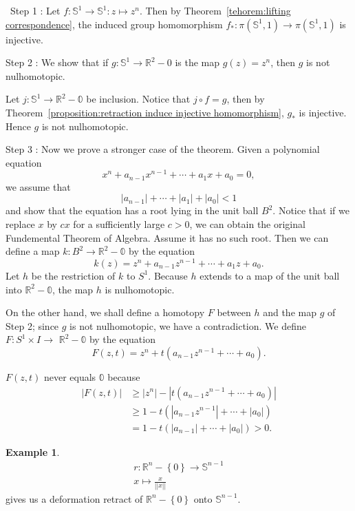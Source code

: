 \documentclass[12pt,a4paper]{book}
\newenvironment{prooff}{{\noindent\it\textcolor{cyan!40!black}{Proof}:}\,}{\par}
\newcommand{\bbrace}[1]{\left\{ #1 \right\} }
\newcommand{\bb}[1]{\mathbb{#1}}
\theoremstyle{definition}
\newtheorem{exam}[defn]{Example}
\begin{document}
\begin{prooff}
    Step 1 : Let $f:\bb{S}^1\rightarrow \bb{S}^1: z\mapsto z^n$. Then by Theorem~\ref{tehorem:lifting correspondence}, the induced group homomorphism $f_*:\pi(\bb{S}^1,1)\rightarrow \pi(\bb{S}^1,1)$ is injective.

    Step 2 : We show that if $g: \bb{S}^1 \rightarrow \mathbb{R}^2-0$ is the map $g(z)=z^n$, then $g$ is not nulhomotopic.

    Let $j:\bb{S}^1\rightarrow \mathbb{R}^2-\mathbb{0}$ be inclusion. Notice that $j\circ f=g $, then by Theorem~\ref{proposition:retraction induce injective homomorphism}, $g_*$ is injective. Hence $g$ is not nulhomotopic.

    Step 3 : Now we prove a stronger case of the theorem. Given a polynomial equation
    $$
        x^n+a_{n-1} x^{n-1}+\cdots+a_1 x+a_0=0,
    $$
    we assume that
    $$
        \left|a_{n-1}\right|+\cdots+\left|a_1\right|+\left|a_0\right|<1
    $$
    and show that the equation has a root lying in the unit ball $B^2$. Notice that if we replace $x$ by $cx$ for a sufficiently large $c>0$, we can obtain the original Fundemental Theorem of Algebra.
    Assume it has no such root. Then we can define a map $k: B^2 \rightarrow \mathbb{R}^2-\mathbb{0}$ by the equation
    $$
        k(z)=z^n+a_{n-1} z^{n-1}+\cdots+a_1 z+a_0 .
    $$
    Let $h$ be the restriction of $k$ to $S^1$. Because $h$ extends to a map of the unit ball into $\mathbb{R}^2-\mathbb{0}$, the map $h$ is nulhomotopic.

    On the other hand, we shall define a homotopy $F$ between $h$ and the map $g$ of Step 2; since $g$ is not nulhomotopic, we have a contradiction. We define $F: S^1 \times I \rightarrow$ $\mathbb{R}^2-\mathbb{0}$ by the equation
    $$
        F(z, t)=z^n+t\left(a_{n-1} z^{n-1}+\cdots+a_0\right) .
    $$

    $F(z, t)$ never equals $\mathbb{0}$ because
    $$
        \begin{aligned}
            |F(z, t)| & \geq\left|z^n\right|-\left|t\left(a_{n-1} z^{n-1}+\cdots+a_0\right)\right| \\
                      & \geq 1-t\left(\left|a_{n-1} z^{n-1}\right|+\cdots+\left|a_0\right|\right)  \\
                      & =1-t\left(\left|a_{n-1}\right|+\cdots+\left|a_0\right|\right)>0 .
        \end{aligned}
    $$
\end{prooff}

\begin{exam}
    \begin{align*}
        r: \bb{R}^n-\bbrace{0}\rightarrow \bb{S}^{n-1} \\
        x\mapsto \frac{x}{||x||}
    \end{align*}
    gives us a deformation retract of $\bb{R}^n-\bbrace{0}$ onto $\bb{S}^{n-1}$.
\end{exam}
\end{document}
